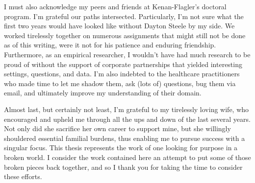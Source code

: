 I must also acknowledge my peers and friends at Kenan-Flagler’s doctoral program. I’m grateful our paths intersected. Particularly, I’m not sure what the first two years would have looked like without Dayton Steele by my side. We worked tirelessly together on numerous assignments that might still not be done as of this writing, were it not for his patience and enduring friendship. Furthermore, as an empirical researcher, I wouldn’t have had much research to be proud of without the support of corporate partnerships that yielded interesting settings, questions, and data. I’m also indebted to the healthcare practitioners who made time to let me shadow them, ask (lots of) questions, bug them via email, and ultimately improve my understanding of their domain.

Almost last, but certainly not least, I’m grateful to my tirelessly loving wife, who encouraged and upheld me through all the ups and down of the last several years. Not only did she sacrifice her own career to support mine, but she willingly shouldered essential familial burdens, thus enabling me to pursue success with a singular focus.
This thesis represents the work of one looking for purpose in a broken world. I consider the work contained here an attempt to put some of those broken pieces back together, and so I thank you for taking the time to consider these efforts.


\clearpage
